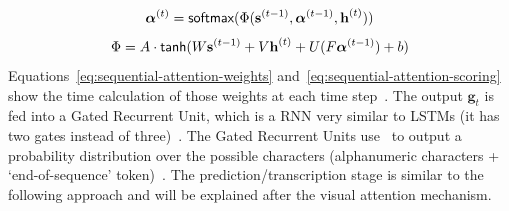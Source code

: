 \begin{equation}\label{eq:sequential-attention-weights}
    \boldsymbol{\alpha}^{(t)}=\textsf{softmax}(\Phi(\textbf{s}^{(t-1)},\boldsymbol{\alpha}^{(t-1)},
        \textbf{h}^{(t)}))
\end{equation}
\begin{equation}\label{eq:sequential-attention-scoring}
    \Phi=A\cdot\textsf{tanh}(W\textbf{s}^{(t-1)}+V\textbf{h}^{(t)}+U(F\boldsymbol{\alpha}^{(t-1)})+b)
\end{equation}
Equations~\ref{eq:sequential-attention-weights} and~\ref{eq:sequential-attention-scoring} show the
time calculation of those weights at each time step~\citep{shi_robust_2016}.
The output $\textbf{g}_t$ is fed into a Gated Recurrent Unit, which is a \ac{RNN} very similar to
\acp{LSTM} (it has two gates instead of three)~\citep{dey_gate-variants_2017}.
The Gated Recurrent Units use \sfmx\ to output a probability distribution over the possible
characters (alphanumeric characters + `end-of-sequence' token)~\citep{shi_robust_2016}.
The prediction/transcription stage is similar to the following approach and will be explained after
the visual attention mechanism.

